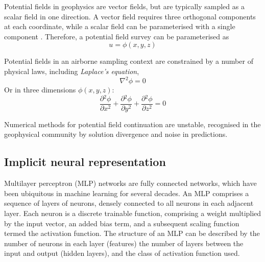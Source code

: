 \documentclass[manuscript.tex]{subfiles}
\begin{document}
\label{sec:geo_physics}
Potential fields in geophysics are vector fields, but are typically sampled as a scalar field in one direction.
A vector field requires three orthogonal components at each coordinate, while a scalar field can be parameterised with a single component \parencite{blakelyPotentialTheoryGravity1996}.
Therefore, a potential field survey can be parameterised as
\begin{equation}
    u = \phi\left(x,y,z\right)
\end{equation}


Potential fields in an airborne sampling context are constrained by a number of physical laws, including \emph{Laplace's equation},
\[
    \nabla^2 \phi = 0
\]
Or in three dimensions \( \phi\left(x,y,z\right) \):
\begin{equation}
    \label{eqn:Laplace}
    \frac{\partial{}^2\phi}{\partial{}x^2} + \frac{\partial{}^2\phi}{\partial{}y^2} + \frac{\partial{}^2\phi}{\partial{}z^2} = 0
\end{equation}


Numerical methods for potential field continuation are unstable, recognised in the geophysical community by solution divergence and noise in predictions.

\subsection{Implicit neural representation}
\label{sec:inr}
Multilayer perceptron (MLP) networks are fully connected networks, which have been ubiquitous in machine learning for several decades.
An MLP comprises a sequence of layers of neurons, densely connected to all neurons in each adjacent layer.
Each neuron is a discrete trainable function, comprising a weight multiplied by the input vector, an added bias term, and a subsequent scaling function termed the activation function.
The structure of an MLP can be described by the number of neurons in each layer (features) the number of layers between the input and output (hidden layers), and the class of activation function used.
\end{document}
